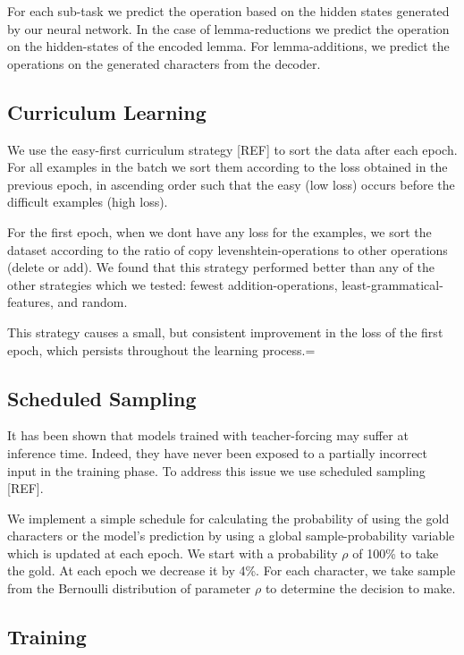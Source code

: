 \documentclass[11pt,a4paper]{article}
\begin{document}
For each sub-task we predict the operation based on the hidden states
generated by our neural network. In the case of lemma-reductions we
predict the operation on the hidden-states of the encoded lemma. For
lemma-additions, we predict the operations on the generated characters
from the decoder.

\subsection{Curriculum Learning}

We use the easy-first curriculum strategy [REF] to sort the data after
each epoch. For all examples in the batch we sort them according to
the loss obtained in the previous epoch, in ascending order such that the easy (low loss) occurs
before the difficult examples (high loss).  

For the first epoch, when we dont have any loss for the examples, we
sort the dataset according to the ratio of copy levenshtein-operations
to other operations (delete or add). We found that this strategy
performed better than any of the other strategies which we tested:
fewest addition-operations, least-grammatical-features, and random.

This strategy causes a small, but consistent improvement in the loss
of the first epoch, which persists throughout the learning process.=

\subsection{Scheduled Sampling}


It has been shown that models trained with teacher-forcing may suffer
at inference time. Indeed, they have never been exposed to a partially
incorrect input in the training phase.  To address this issue we use
scheduled sampling [REF].

We implement a simple schedule for calculating the probability of
using the gold characters or the model's prediction by using a global
sample-probability variable which is updated at each epoch. We start
with a probability \(\rho\) of 100\% to take the gold. At each epoch
we decrease it by 4\%. For each character, we take sample from the
Bernoulli distribution of parameter \(\rho\) to determine the
decision to make.

\subsection{Training}
\end{document}
